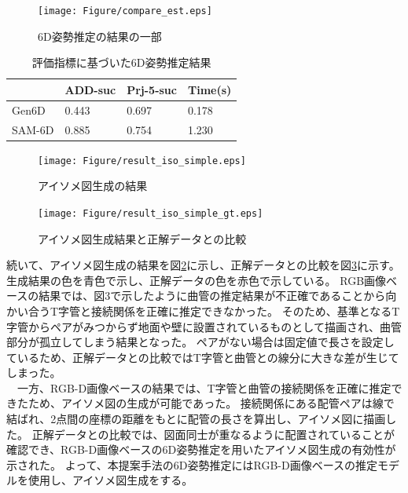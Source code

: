 \begin{figure}[htbt]
	\centering
	\texttt{[image: Figure/compare\_est.eps]}
	\caption{6D姿勢推定の結果の一部}
	\label{fig:4-f7}
\end{figure}

\begin{table}[h]
	\centering
	\caption{評価指標に基づいた6D姿勢推定結果}
	\begin{tabular}{|p{1.7cm}|p{1.7cm}|p{1.7cm}|p{1.7cm}|}
	\hline
	& ADD-suc & Prj-5-suc & Time(s) \\
	\hline
	Gen6D & 0.443 & 0.697 & 0.178 \\
	\hline
	SAM-6D & 0.885 & 0.754 & 1.230 \\
	\hline
	\end{tabular}
\end{table}


\begin{figure}[htbt]
	\centering
	\texttt{[image: Figure/result\_iso\_simple.eps]}
	\caption{アイソメ図生成の結果}
	\label{fig:4-f8}
\end{figure}
\begin{figure}[htbt]
	\centering
	\texttt{[image: Figure/result\_iso\_simple\_gt.eps]}
	\caption{アイソメ図生成結果と正解データとの比較}
	\label{fig:4-f9}
\end{figure}
続いて、アイソメ図生成の結果を図\ref{fig:4-f8}に示し、正解データとの比較を図\ref{fig:4-f9}に示す。
生成結果の色を青色で示し、正解データの色を赤色で示している。
RGB画像ベースの結果では、図3で示したように曲管の推定結果が不正確であることから向かい合うT字管と接続関係を正確に推定できなかった。
そのため、基準となるT字管からペアがみつからず地面や壁に設置されているものとして描画され、曲管部分が孤立してしまう結果となった。
ペアがない場合は固定値で長さを設定しているため、正解データとの比較ではT字管と曲管との線分に大きな差が生じてしまった。\\
　一方、RGB-D画像ベースの結果では、T字管と曲管の接続関係を正確に推定できたため、アイソメ図の生成が可能であった。
接続関係にある配管ペアは線で結ばれ、2点間の座標の距離をもとに配管の長さを算出し、アイソメ図に描画した。
正解データとの比較では、図面同士が重なるように配置されていることが確認でき、RGB-D画像ベースの6D姿勢推定を用いたアイソメ図生成の有効性が示された。
よって、本提案手法の6D姿勢推定にはRGB-D画像ベースの推定モデルを使用し、アイソメ図生成をする。
